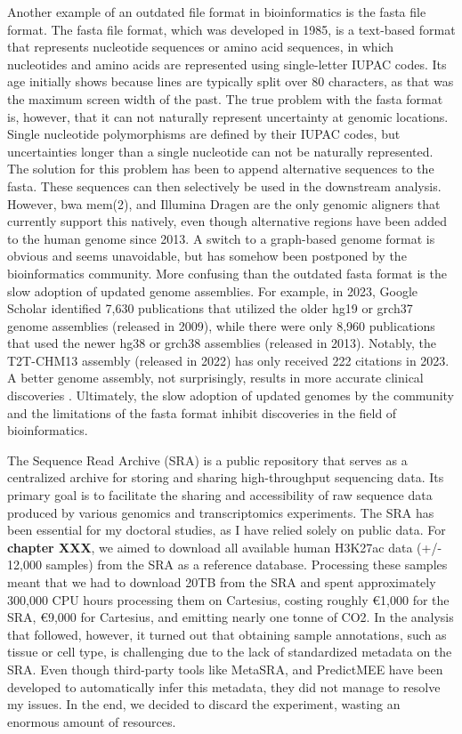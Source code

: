 Another example of an outdated file format in bioinformatics is the fasta file format\cite{Lipman1985}. The fasta file format, which was developed in 1985, is a text-based format that represents nucleotide sequences or amino acid sequences, in which nucleotides and amino acids are represented using single-letter IUPAC codes. Its age initially shows because lines are typically split over 80 characters, as that was the maximum screen width of the past. The true problem with the fasta format is, however, that it can not naturally represent uncertainty at genomic locations. Single nucleotide polymorphisms are defined by their IUPAC codes, but uncertainties longer than a single nucleotide can not be naturally represented. The solution for this problem has been to append alternative sequences to the fasta. These sequences can then selectively be used in the downstream analysis. However, bwa mem(2)\cite{bwamem,bwamem2}, and Illumina Dragen are the only genomic aligners that currently support this natively, even though alternative regions have been added to the human genome since 2013. A switch to a graph-based genome format\cite{Li2020} is obvious and seems unavoidable, but has somehow been postponed by the bioinformatics community. More confusing than the outdated fasta format is the slow adoption of updated genome assemblies. For example, in 2023, Google Scholar identified 7,630 publications that utilized the older hg19 or grch37 genome assemblies (released in 2009), while there were only 8,960 publications that used the newer hg38 or grch38 assemblies (released in 2013). Notably, the T2T-CHM13 assembly (released in 2022) has only received 222 citations in 2023. A better genome assembly, not surprisingly, results in more accurate clinical discoveries \cite{Aganezov2022}. Ultimately, the slow adoption of updated genomes by the community and the limitations of the fasta format inhibit discoveries in the field of bioinformatics.

The Sequence Read Archive (SRA) is a public repository that serves as a centralized archive for storing and sharing high-throughput sequencing data. Its primary goal is to facilitate the sharing and accessibility of raw sequence data produced by various genomics and transcriptomics experiments. The SRA has been essential for my doctoral studies, as I have relied solely on public data. For \textbf{chapter XXX}, we aimed to download all available human H3K27ac data (+/- 12,000 samples) from the SRA as a reference database. Processing these samples meant that we had to download 20TB from the SRA and spent approximately 300,000 CPU hours processing them on Cartesius, costing roughly €1,000 for the SRA\cite{amazon}, €9,000 for Cartesius\cite{cartesius}, and emitting nearly one tonne of CO2\cite{CO2}. In the analysis that followed, however, it turned out that obtaining sample annotations, such as tissue or cell type, is challenging due to the lack of standardized metadata on the SRA. Even though third-party tools like MetaSRA\cite{Bernstein2017}, and PredictMEE\cite{Klie2021} have been developed to automatically infer this metadata, they did not manage to resolve my issues. In the end, we decided to discard the experiment, wasting an enormous amount of resources.

